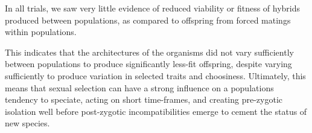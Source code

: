 In all trials, we saw very little evidence of reduced viability or fitness of hybrids produced between populations, as compared to offspring from forced matings within populations.

This indicates that the architectures of the organisms did not vary sufficiently between populations to produce significantly less-fit offspring, despite varying sufficiently to produce variation in selected traits and choosiness.
Ultimately, this means that sexual selection can have a strong influence on a populations tendency to speciate, acting on short time-frames, and creating pre-zygotic isolation well before post-zygotic incompatibilities emerge to cement the status of new species.